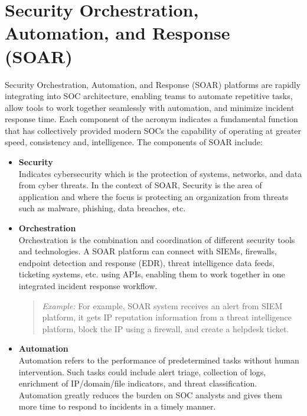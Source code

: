 \chapter{Security Orchestration, Automation, and Response (SOAR)}

Security Orchestration, Automation, and Response (SOAR) platforms are rapidly integrating into SOC architecture, enabling teams to automate repetitive tasks, allow tools to work together seamlessly with automation, and minimize incident response time. Each component of the acronym indicates a fundamental function that has collectively provided modern SOCs the capability of operating at greater speed, consistency and, intelligence. The components of SOAR include: 

\begin{itemize}
    \item \textbf{Security} \\
    Indicates cybersecurity which is the protection of systems, networks, and data from cyber threats. In the context of SOAR, Security is the area of application and where the focus is protecting an organization from threats such as malware, phishing, data breaches, etc.

    \item \textbf{Orchestration} \\
    Orchestration is the combination and coordination of different security tools and technologies. A SOAR platform can connect with SIEMs, firewalls, endpoint detection and response (EDR), threat intelligence data feeds, ticketing systems, etc. using APIs, enabling them to work together in one integrated incident response workflow.

    \begin{quote}
        \textit{Example:} For example, SOAR system receives an alert from SIEM platform, it gets IP reputation information from a threat intelligence platform, block the IP using a firewall, and create a helpdesk ticket.
    \end{quote}

    \item \textbf{Automation} \\
    Automation refers to the performance of predetermined tasks without human intervention. Such tasks could include alert triage, collection of logs, enrichment of IP/domain/file indicators, and threat classification. Automation greatly reduces the burden on SOC analysts and gives them more time to respond to incidents in a timely manner.


\end{itemize}
